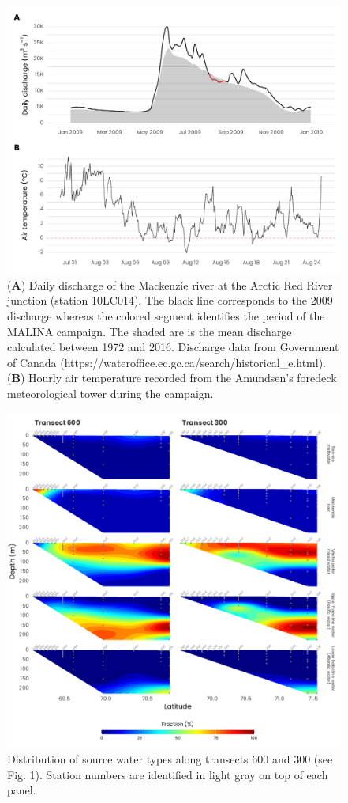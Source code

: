 \documentclass[essd, manuscript]{copernicus}
\begin{document}
\begin{figure}[H]
	\centering
	\includegraphics[scale = 1]{../../../graphs/fig02.pdf}
	\caption{(\textbf{A}) Daily discharge of the Mackenzie river at the Arctic Red River junction (station 10LC014). The black line corresponds to the 2009 discharge whereas the colored segment identifies the period of the MALINA campaign. The shaded are is the mean discharge calculated between 1972 and 2016. Discharge data from Government of Canada (https://wateroffice.ec.gc.ca/search/historical\_e.html). (\textbf{B}) Hourly air temperature recorded from the Amundsen's foredeck meteorological tower during the campaign.}
\end{figure}

\clearpage

\begin{figure}[H]
	\centering
	\includegraphics[scale = 1]{../../../graphs/fig03.pdf}
	\caption{Distribution of source water types along transects 600 and 300 (see Fig. 1). Station numbers are identified in light gray on top of each panel.}
\end{figure}
\end{document}
